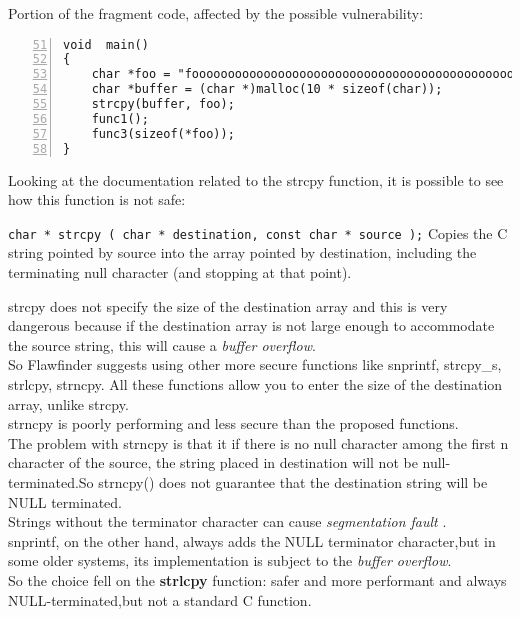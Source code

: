 \documentclass[a4paper,12pt]{article}
\newenvironment{SpecialPar}
  {\begin{shaded}}
  {\end{shaded}}
\begin{document}
Portion of the fragment code, affected by the possible vulnerability:
\begin{lstlisting}[style=c,numbers=left,firstnumber=51,linebackgroundcolor={\ifnum\value{lstnumber}=55\color{red}\fi}]
void  main()
{
	char *foo = "fooooooooooooooooooooooooooooooooooooooooooooooooooo";
	char *buffer = (char *)malloc(10 * sizeof(char));
	strcpy(buffer, foo);
	func1();
	func3(sizeof(*foo));
}
\end{lstlisting}
Looking at the documentation related to the strcpy function\cite{strcpy}, it is possible to see how this function is not safe:\\
\begin{SpecialPar}
\noindent
\texttt{char * strcpy ( char * destination, const char * source );}
Copies the C string pointed by source into the array 		pointed by destination, including the terminating null character (and stopping at that point).
\end{SpecialPar}
\noindent
strcpy does not specify the size of the destination array and this is very dangerous because if the destination array is not large enough to accommodate the source string, this will cause a \textit{buffer overflow}.\\
So Flawfinder suggests using other more secure functions like snprintf, strcpy\_s, strlcpy, strncpy.
All these functions allow you to enter the size of the destination array, unlike strcpy.\\
strncpy is poorly performing and less secure than the proposed functions.\\
The problem with strncpy is that it if there is no null character among the first n character of the source, the string placed in destination will not be null-terminated.So strncpy() does not guarantee that the destination string will be NULL terminated.\\ Strings without the terminator character can cause \textit{segmentation fault} \cite{geeksstrcpy}.\\
snprintf, on the other hand, always adds the NULL terminator character,but in some older systems, its implementation is subject to the \textit{buffer overflow}\cite{dangerc}.\\
So the choice fell on the \textbf{strlcpy} function: safer and more performant \cite{dangerc} and always NULL-terminated,but not a standard C function.\\
\end{document}
